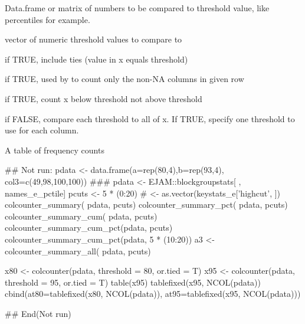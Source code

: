 \documentclass[a4paper]{book}
\begin{document}
\begin{Arguments}
\begin{ldescription}
\item[\code{x}] Data.frame or matrix of numbers to be compared to threshold value,
like percentiles for example.

\item[\code{thresholdlist}] vector of numeric threshold values to compare to

\item[\code{or.tied}] if TRUE, include ties (value in x equals threshold)

\item[\code{na.rm}] if TRUE, used by  to count only the non-NA columns in given row

\item[\code{below}] if TRUE, count x below threshold not above threshold

\item[\code{one.cut.per.col}] if FALSE, compare each threshold to all of x.
If TRUE, specify one threshold to use for each column.
\end{ldescription}
\end{Arguments}
%
\begin{Value}
A table of frequency counts
\end{Value}
%
\begin{SeeAlso}\relax
{}    

\end{SeeAlso}
%
\begin{Examples}
\begin{ExampleCode}
## Not run: 
 pdata <- data.frame(a=rep(80,4),b=rep(93,4), col3=c(49,98,100,100))
  ### pdata <- EJAM::blockgroupstats[ , names_e_pctile]
 pcuts <-  5 * (0:20)  # <- as.vector(keystats_e['highcut', ])
colcounter_summary(        pdata, pcuts)
colcounter_summary_pct(    pdata, pcuts)
colcounter_summary_cum(    pdata, pcuts)
colcounter_summary_cum_pct(pdata, pcuts)
colcounter_summary_cum_pct(pdata, 5 * (10:20))
a3 <- colcounter_summary_all(    pdata, pcuts)

x80 <- colcounter(pdata, threshold = 80, or.tied = T)
x95 <- colcounter(pdata, threshold = 95, or.tied = T)
table(x95)
tablefixed(x95, NCOL(pdata))
cbind(at80=tablefixed(x80, NCOL(pdata)), at95=tablefixed(x95, NCOL(pdata)))
  
## End(Not run)

\end{ExampleCode}
\end{Examples}
\end{document}
